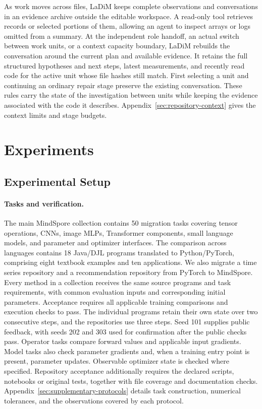 \documentclass{article}
\begin{document}
As work moves across files, LaDiM keeps complete observations and conversations in an evidence archive outside the editable workspace. A read-only tool retrieves records or selected portions of them, allowing an agent to inspect arrays or logs omitted from a summary. At the independent role handoff, an actual switch between work units, or a context capacity boundary, LaDiM rebuilds the conversation around the current plan and available evidence. It retains the full structured hypotheses and next steps, latest measurements, and recently read code for the active unit whose file hashes still match. First selecting a unit and continuing an ordinary repair stage preserve the existing conversation. These rules carry the state of the investigation between units while keeping the evidence associated with the code it describes. Appendix~\ref{sec:repository-context} gives the context limits and stage budgets.


\section{Experiments}

\subsection{Experimental Setup}
\label{sec:setup}

\paragraph{Tasks and verification.}
The main MindSpore collection contains 50 migration tasks covering tensor operations, CNNs, image MLPs, Transformer components, small language models, and parameter and optimizer interfaces. The comparison across languages contains 18 Java/DJL programs translated to Python/PyTorch, comprising eight textbook examples and ten applications. We also migrate a time series repository and a recommendation repository from PyTorch to MindSpore. Every method in a collection receives the same source programs and task requirements, with common evaluation inputs and corresponding initial parameters. Acceptance requires all applicable training comparisons and execution checks to pass. The individual programs retain their own state over two consecutive steps, and the repositories use three steps. Seed 101 supplies public feedback, with seeds 202 and 303 used for confirmation after the public checks pass. Operator tasks compare forward values and applicable input gradients. Model tasks also check parameter gradients and, when a training entry point is present, parameter updates. Observable optimizer state is checked where specified. Repository acceptance additionally requires the declared scripts, notebooks or original tests, together with file coverage and documentation checks. Appendix~\ref{sec:supplementary-protocols} details task construction, numerical tolerances, and the observations covered by each protocol.
\end{document}

